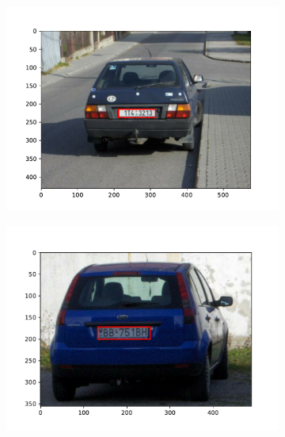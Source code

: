 \begin{figure}
    \centering
    \begin{subfigure}{0.32\textwidth}
        \centering
        \includegraphics[width=\textwidth]{abbildungen/car_1}
    \end{subfigure}
    \begin{subfigure}{0.32\textwidth}
        \centering
        \includegraphics[width=\textwidth]{abbildungen/car_2}
    \end{subfigure}
    \begin{subfigure}{0.32\textwidth}
        \centering

\end{subfigure}
\end{figure}
